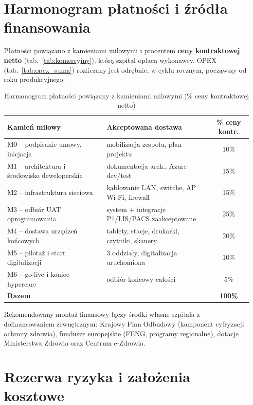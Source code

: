 \section{Harmonogram płatności i źródła finansowania}

Płatności powiązano z kamieniami milowymi i procentem \textbf{ceny kontraktowej netto} (tab.~\ref{tab:komercyjny}), którą szpital opłaca wykonawcy. OPEX (tab.~\ref{tab:opex_suma}) rozliczany jest odrębnie, w cyklu rocznym, począwszy od roku produkcyjnego.

\begin{table}[h]
\centering
\small
\renewcommand{\arraystretch}{1.2}
\begin{tabular}{|L{5.5cm}|L{5.5cm}|c|}
\hline
{}\textbf{Kamień milowy} & \textbf{Akceptowana dostawa} & \textbf{\% ceny kontr.} \\
\hline
M0 -- podpisanie umowy, inicjacja & mobilizacja zespołu, plan projektu & 10\% \\
\hline
M1 -- architektura i środowisko deweloperskie & dokumentacja arch., Azure dev/test & 15\% \\
\hline
M2 -- infrastruktura sieciowa & kablowanie LAN, switche, AP Wi-Fi, firewall & 15\% \\
\hline
M3 -- odbiór UAT oprogramowania & system + integracje P1/LIS/PACS zaakceptowane & 25\% \\
\hline
M4 -- dostawa urządzeń końcowych & tablety, stacje, drukarki, czytniki, skanery & 20\% \\
\hline
M5 -- pilotaż i start digitalizacji & 3 oddziały, digitalizacja uruchomiona & 10\% \\
\hline
M6 -- go-live i koniec hypercare & odbiór końcowy całości & 5\% \\
\hline
{}\textbf{Razem} & & \textbf{100\%} \\
\hline
\end{tabular}
\caption{Harmonogram płatności powiązany z kamieniami milowymi (\% ceny kontraktowej netto)}
\label{tab:platnosci}
\end{table}

Rekomendowany montaż finansowy łączy środki własne szpitala z dofinansowaniem zewnętrznym: Krajowy Plan Odbudowy (komponent cyfryzacji ochrony zdrowia), fundusze europejskie (FENG, programy regionalne), dotacje Ministerstwa Zdrowia oraz Centrum e-Zdrowia.

\section{Rezerwa ryzyka i założenia kosztowe}

